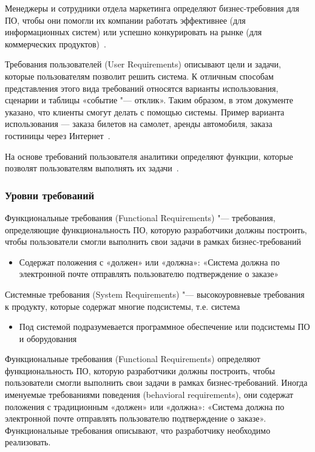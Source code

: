 \documentclass{../industrial-development}
\begin{document}
Менеджеры и сотрудники отдела маркетинга определяют бизнес-требовния для ПО, чтобы они помогли их компании работать эффективнее (для информационных систем) или успешно конкурировать на рынке (для коммерческих продуктов)~\cite[с.~11]{Wiegers}.

\alert{Требования пользователей (User Requirements)} описывают цели и задачи, которые пользователям позволит решить система. К отличным способам представления этого вида требований относятся варианты использования, сценарии и таблицы «событие "--- отклик». Таким образом, в этом документе указано, что клиенты смогут делать с помощью системы. Пример варианта использования — заказа билетов на самолет, аренды автомобиля, заказа гостиницы через Интернет~\cite[с.~8--9]{Wiegers}.

На основе требований пользователя аналитики определяют функции, которые позволят пользователям выполнять их задачи~\cite[с.~11]{Wiegers}.


\begin{frame} \frametitle{Уровни требований}
  \begin{block}{}
\alert{Функциональные требования} (Functional Requirements) "--- требования, определяющие функциональность ПО, которую разработчики должны построить, чтобы пользователи смогли выполнить свои задачи в рамках бизнес-требований
  \end{block}
 \begin{itemize}
\item Содержат положения с «должен» или «должна»: «Система должна по электронной почте отправлять пользователю подтверждение о заказе»
 \end{itemize}
\begin{block}{}
\alert{Системные требования} (System Requirements) "--- высокоуровневые требования к продукту, которые содержат многие подсистемы, т.е. система
  \end{block}
 	\begin{itemize}
\item Под системой подразумевается программное обеспечение или подсистемы ПО и оборудования
	\end{itemize}
\end{frame}

\lecturenotes

\alert{Функциональные требования (Functional Requirements)} определяют функциональность ПО, которую разработчики должны построить, чтобы пользователи смогли выполнить свои задачи в рамках бизнес-требований. Иногда именуемые требованиями поведения (behavioral requirements), они содержат положения с традиционным «должен» или «должна»: «Система должна по электронной почте отправлять пользователю подтверждение о заказе». Функциональные требования описывают, что разработчику необходимо реализовать.
\end{document}

